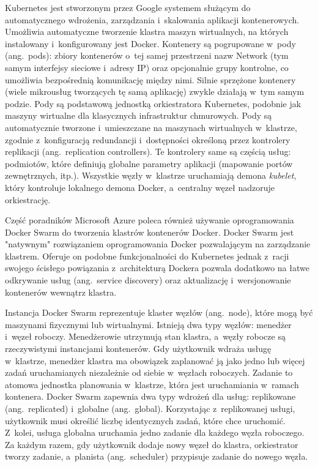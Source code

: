 Kubernetes jest stworzonym przez Google systemem służącym do automatycznego wdrożenia, zarządzania i~skalowania aplikacji kontenerowych. Umożliwia automatyczne tworzenie klastra maszyn wirtualnych, na których instalowany i~konfigurowany jest Docker. Kontenery są pogrupowane w~pody (ang.~pods): zbiory kontenerów o~tej samej przestrzeni nazw Network (tym samym interfejsy sieciowe i~adresy IP) oraz opcjonalnie grupy kontrolne, co umożliwia bezpośrednią komunikację między nimi. Silnie sprzężone kontenery (wiele mikrousług tworzących tę samą aplikację) zwykle działają w~tym samym podzie. Pody są podstawową jednostką orkiestratora Kubernetes, podobnie jak maszyny wirtualne dla klasycznych infrastruktur chmurowych. Pody są automatycznie tworzone i~umieszczane na maszynach wirtualnych w~klastrze, zgodnie z~konfiguracją redundancji i~dostępności określoną przez kontrolery replikacji (ang.~replication controllers). Te kontrolery same są częścią usług: podmiotów, które definiują globalne parametry aplikacji (mapowanie portów zewnętrznych, itp.). Wszystkie węzły w~klastrze uruchamiają demona \textit{kubelet}, który kontroluje lokalnego demona Docker, a~centralny węzeł nadzoruje orkiestrację.

Część poradników Microsoft Azure poleca również używanie oprogramowania Docker Swarm do tworzenia klastrów kontenerów Docker. Docker Swarm jest "natywnym" rozwiązaniem oprogramowania Docker pozwalającym na zarządzanie klastrem. Oferuje on podobne funkcjonalności do Kubernetes jednak z~racji swojego ścisłego powiązania z~architekturą Dockera pozwala dodatkowo na łatwe odkrywanie usług (ang.~service discovery) oraz aktualizację i~wersjonowanie kontenerów wewnątrz klastra. 

Instancja Docker Swarm reprezentuje klaster węzłów (ang.~node), które mogą być maszynami fizycznymi lub wirtualnymi. Istnieją dwa typy węzłów: menedżer i~węzeł roboczy. Menedżerowie utrzymują stan klastra, a~węzły robocze są rzeczywistymi instancjami kontenerów. Gdy użytkownik wdraża usługę w~klastrze, menedżer klastra ma obowiązek zaplanować ją jako jedno lub więcej zadań uruchamianych niezależnie od siebie w~węzłach roboczych. Zadanie to atomowa jednostka planowania w~klastrze, która jest uruchamiania w~ramach kontenera. Docker Swarm zapewnia dwa typy wdrożeń dla usług: replikowane (ang.~replicated) i~globalne (ang.~global). Korzystając z~replikowanej usługi, użytkownik musi określić liczbę identycznych zadań, które chce uruchomić. Z~kolei, usługa globalna uruchamia jedno zadanie dla każdego węzła roboczego. Za każdym razem, gdy użytkownik dodaje nowy węzeł do klastra, orkiestrator tworzy zadanie, a~planista (ang.~scheduler) przypisuje zadanie do nowego węzła.

